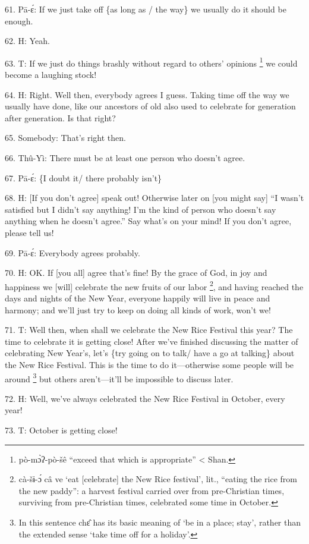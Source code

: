 61. Pā-ɛ́: If we just take off \{as long as / the way\} we usually do it should
be enough.

62. H: Yeah.

63. T: If we just do things brashly without regard to others' opinions \footnote{pò-mɔ̀ʔ-pò-šê ``exceed that which is appropriate'' < Shan.} we
could become a laughing stock!

64. H: Right.  Well then, everybody agrees I guess.  Taking time off the way we
usually have done, like our ancestors of old also used to celebrate for generation
after generation.  Is that right?

65. Somebody: That's right then.

66. Thû-Yì: There must be at least one person who doesn't agree.

67. Pā-ɛ́: \{I doubt it/ there probably isn't\}

68. H: [If you don't agree] speak out!  Otherwise later on [you might say] ``I
wasn't satisfied but I didn't say anything! I'm the kind of person who doesn't
say anything when he doesn't agree.'' Say what's on your mind!  If you don't agree,
please tell us!

69. Pā-ɛ́: Everybody agrees probably.

70. H: OK. If [you all] agree that's fine!  By the grace of God, in joy and happiness
we [will] celebrate the new fruits of our labor \footnote{cà-šɨ-ɔ́ câ ve `eat [celebrate] the New Rice festival', lit., ``eating the rice from the new paddy'': a harvest festival carried over from pre-Christian times, surviving from pre-Christian times, celebrated some time in October.}, and having reached the days
and nights of the New Year, everyone happily will live in peace and harmony; and
we'll just try to keep on doing all kinds of work, won't we!

71. T: Well then, when shall we celebrate the New Rice Festival this year?  The
time to celebrate it is getting close!  After we've finished discussing the matter
of celebrating New Year's, let's \{try going on to talk/ have a go at talking\}
about the New Rice Festival.  This is the time to do it---otherwise some people
will be around \footnote{In this sentence chɛ̂ has its basic meaning of `be in a place; stay', rather than the extended sense `take time off for a holiday'.} but others aren't---it'll be impossible to discuss later.

72. H: Well, we've always celebrated the New Rice Festival in October, every year!

73. T: October is getting close!

